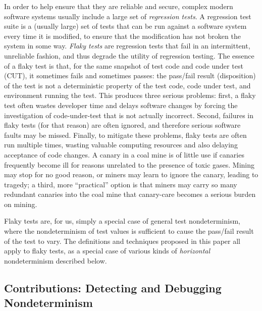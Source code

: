 In order to help ensure that they are reliable and secure, complex
modern software systems usually include a large set of
\emph{regression tests}.  A regression test suite is a (usually large)
set of tests that can be run against a software system every time it
is modified, to ensure that the modification has not broken the system
in some way.  \emph{Flaky tests} \cite{miccoflaky} are regression
tests that fail in an intermittent, unreliable fashion, and thus
degrade the utility of regression testing.  The essence of a flaky
test is that, for the same snapshot of test code and code under test
(CUT), it sometimes fails and sometimes passes: the pass/fail result (disposition) of the
test is not a deterministic property of the test code, code under
test, and environment running the test.  This produces three serious
problems: first, a flaky test often wastes developer time and delays
software changes by forcing the investigation of code-under-test that
is not actually incorrect.  Second, failures in flaky tests (for that
reason) are often ignored, and therefore serious software faults may
be missed.  Finally, to mitigate these problems, flaky tests are often
run multiple times, wasting valuable computing resources and also
delaying acceptance of code changes.  A canary in a coal mine is of
little use if canaries frequently become ill for reasons unrelated to
the presence of toxic gases.  Mining may stop for no good reason, or
miners may learn to ignore the canary, leading to tragedy; a third,
more ``practical'' option is that miners may carry so many redundant
canaries into the coal mine that canary-care becomes a serious burden
on mining.

Flaky tests are, for us, simply a special case of general test
nondeterminism, where the nondeterminism of test values is sufficient
to cause the pass/fail result of the test to vary.  The definitions
and techniques proposed in this paper all apply to flaky tests, as a
special case of various kinds of \emph{horizontal} nondeterminism described below.

\subsection{Contributions:  Detecting and Debugging Nondeterminism}


